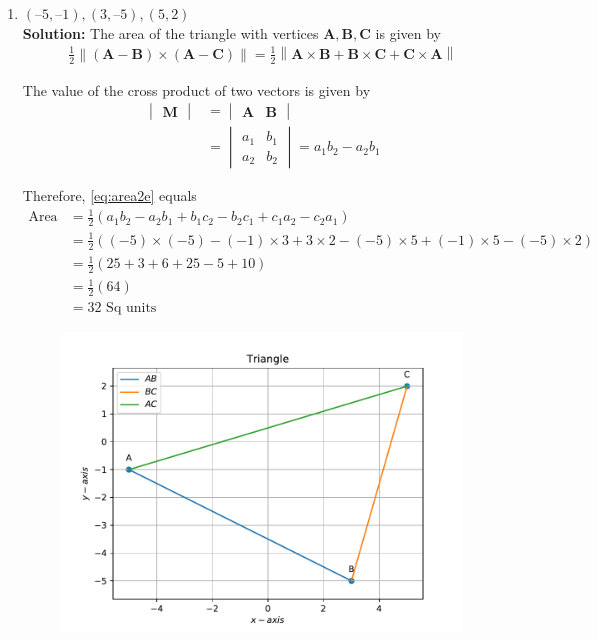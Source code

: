 \documentclass[12pt]{article}
\newcommand{\mydet}[1]{\ensuremath{\begin{vmatrix}#1\end{vmatrix}}}
\providecommand{\brak}[1]{\ensuremath{\left(#1\right)}}
\providecommand{\norm}[1]{\left\lVert#1\right\rVert}
\newcommand{\solution}{\noindent \textbf{Solution: }}
\let\vec\mathbf
\begin{document}
\begin{enumerate}
\begin{enumerate}
\item $(–5, –1), (3, –5), (5, 2)$ \\ 
\solution The area of the triangle with vertices $\vec{A}, \vec{B}, \vec{C}$ is given by  
  \label{prop:area2e}
  \begin{align}
    \label{eq:area2e}
	\frac{1}{2}\norm{\brak{\vec{A}-\vec{B}} \times \brak{\vec{A}-\vec{C}}}
 = 
 \frac{1}{2}\norm{\vec{A} \times \vec{B}+\vec{B} \times \vec{C}+\vec{C} \times \vec{A}}
\end{align}

The value of the cross product of two vectors is given by \\

\begin{align}
  \label{eq:det2e}
  \mydet{\vec{M}} &= \mydet{\vec{A} & \vec{B}} 
  \\
  &= \mydet{a_1 & b_1\\a_2 & b_2} = a_1b_2 - a_2 b_1
\end{align}

		Therefore, \eqref{eq:area2e} equals \\
\begin{align}
	\text{Area} &=	\frac{1}{2}\brak{a_1b_2 - a_2 b_1 + b_1c_2 - b_2 c_1 + c_1a_2 - c_2 a_1}  \\
	&=	\frac{1}{2}\brak{\brak{-5} \times \brak{-5} - \brak{-1} \times 3 + 3 \times 2 - \brak{-5} \times 5 + \brak{-1} \times 5 - \brak{-5} \times 2}  \\
	&=\frac{1}{2}\brak{25 + 3  + 6 + 25 - 5 + 10} \\
	&=\frac{1}{2}\brak{64}  \\
	&=32 \text{ Sq units}	       
\end{align}

\begin{figure}[!h]
	\begin{center}
		\includegraphics[width=\columnwidth]{./figs/problem1b.pdf}
	\end{center}
\caption{}
\label{fig:Fig2}
\end{figure}
\end{enumerate}

\end{enumerate}
\end{document}
